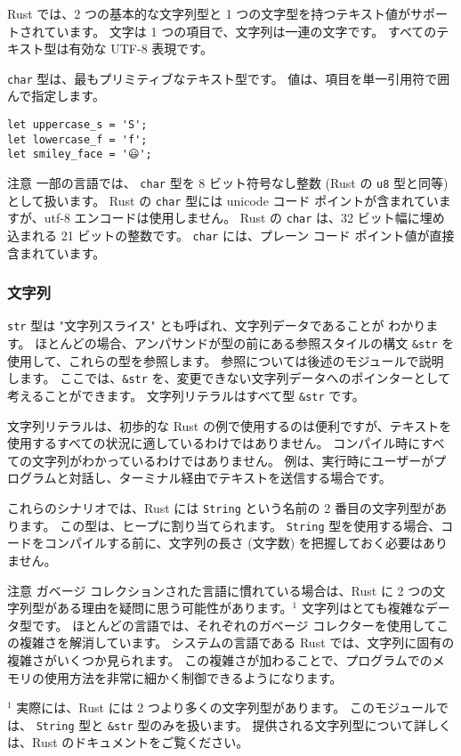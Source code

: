 Rust では、2 つの基本的な文字列型と 1 つの文字型を持つテキスト値がサポートされています。 文字は 1 つの項目で、文字列は一連の文字です。 すべてのテキスト型は有効な UTF-8 表現です。

\texttt{char} 型は、最もプリミティブなテキスト型です。 値は、項目を単一引用符で囲んで指定します。


\begin{lstlisting}[numbers=none]
let uppercase_s = 'S';
let lowercase_f = 'f';
let smiley_face = '😃';
\end{lstlisting}

\begin{itembox}[l]{注意}
一部の言語では、 \texttt{char} 型を 8 ビット符号なし整数 (Rust の \texttt{u8} 型と同等) として扱います。 Rust の \texttt{char} 型には unicode コード ポイントが含まれていますが、utf-8 エンコードは使用しません。 Rust の \texttt{char} は、32 ビット幅に埋め込まれる 21 ビットの整数です。 \texttt{char} には、プレーン コード ポイント値が直接含まれています。
\end{itembox}

\subsubsection{文字列}

\texttt{str} 型は "文字列スライス" とも呼ばれ、文字列データであることが わかります。 ほとんどの場合、アンパサンドが型の前にある参照スタイルの構文 \texttt{\&str} を使用して、これらの型を参照します。 参照については後述のモジュールで説明します。 ここでは、\texttt{\&str} を、変更できない文字列データへのポインターとして考えることができます。 文字列リテラルはすべて型 \texttt{\&str} です。

文字列リテラルは、初歩的な Rust の例で使用するのは便利ですが、テキストを使用するすべての状況に適しているわけではありません。 コンパイル時にすべての文字列がわかっているわけではありません。 例は、実行時にユーザーがプログラムと対話し、ターミナル経由でテキストを送信する場合です。

これらのシナリオでは、Rust には \texttt{String} という名前の 2 番目の文字列型があります。 この型は、ヒープに割り当てられます。 \texttt{String} 型を使用する場合、コードをコンパイルする前に、文字列の長さ (文字数) を把握しておく必要はありません。

\begin{itembox}[l]{注意}
ガベージ コレクションされた言語に慣れている場合は、Rust に 2 つの文字列型がある理由を疑問に思う可能性があります。${}^1$ 文字列はとても複雑なデータ型です。 ほとんどの言語では、それぞれのガベージ コレクターを使用してこの複雑さを解消しています。 システムの言語である Rust では、文字列に固有の複雑さがいくつか見られます。 この複雑さが加わることで、プログラムでのメモリの使用方法を非常に細かく制御できるようになります。

${}^1$ 実際には、Rust には 2 つより多くの文字列型があります。 このモジュールでは、 \texttt{String} 型と \texttt{\&str} 型のみを扱います。 提供される文字列型について詳しくは、Rust のドキュメントをご覧ください。
\end{itembox}

